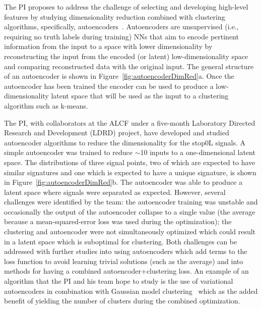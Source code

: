 \documentclass[letter, USenglish, 11pt, subfigure]{article}
\begin{document}
The PI proposes to address the challenge of selecting and developing high-level features by studying dimensionality reduction combined with clustering algorithms, specifically, autoencoders~\cite{BALDI198953}. Autoencoders are unsupervised (i.e., requiring no truth labels during training) NNs that aim to encode pertinent information from the input to a space with lower dimensionality by reconstructing the input from the encoded (or latent) low-dimensionality space and comparing reconstructed data with the original input. 
The general structure of an autoencoder is shown in Figure~\ref{fig:autoencoderDimRed}a. Once the autoencoder has been trained the encoder can be used to produce a low-dimensionality latent space that will be used as the input to a clustering algorithm such as k-means. 

The PI, with collaborators at the ALCF under a five-month Laboratory Directed Research and Development (LDRD) project, have developed and studied autoencoder algorithms to reduce the dimensionality for the stop0L signals. A simple autoencoder was trained to reduce $\sim$10 inputs to a one-dimensional latent space. The distributions of three signal points, two of which are expected to have similar signatures and one which is expected to have a unique signature, is shown in Figure~\ref{fig:autoencoderDimRed}b. The autoencoder was able to produce a latent space where signals were separated as expected. However, several challenges were identified by the team: the autoencoder training was unstable and occasionally the output of the autoencoder collapse to a single value (the average because a mean-squared-error loss was used during the optimization); the clustering and autoencoder were not simultaneously optimized which could result in a latent space which is suboptimal for clustering. Both challenges can be addressed with further studies into using autoencoders which add terms to the loss function to avoid learning trivial solutions (such as the average) and into methods for having a combined autoencoder+clustering loss. An example of an algorithm that the PI and his team hope to study is the use of variational autoencoders in combination with Gaussian model clustering~\cite{prasadVAEImageClus} which as the added benefit of yielding the number of clusters during the combined optimization.
\end{document}
